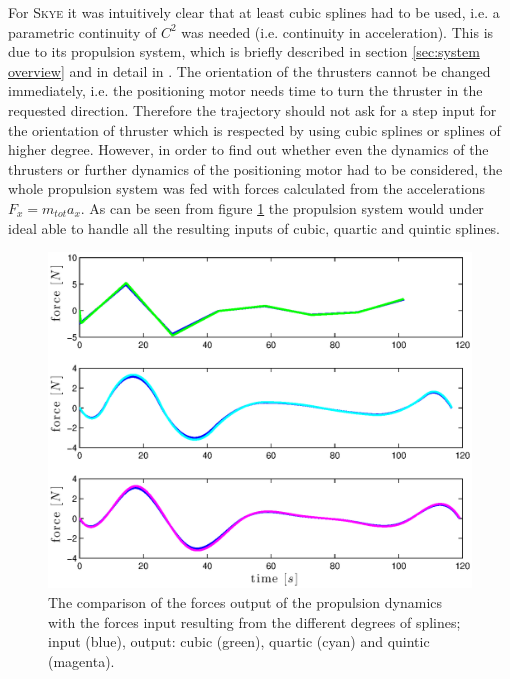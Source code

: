  For \textsc{Skye} it was intuitively clear that at least cubic splines had to be used, i.e. a parametric continuity of $C^2$ was needed (i.e. continuity in acceleration). This is due to its propulsion system, which is briefly described in section \ref{sec:system overview} and in detail in \cite{schaffnervu}. The orientation of the thrusters cannot be changed immediately, i.e. the positioning motor needs time to turn the thruster in the requested direction. Therefore the trajectory should not ask for a step input for the orientation of thruster which is respected by using cubic splines or splines of higher degree. However, in order to find out whether even the dynamics of the thrusters or further dynamics of the positioning motor had to be considered, the whole propulsion system was fed with forces calculated from the accelerations $F_x=m_{tot}a_x$. As can be seen from figure \ref{fig:forces} the propulsion system would under ideal  able to handle all the resulting inputs of cubic, quartic and quintic splines.
 
\begin{figure}[H]
	\centering
    \includegraphics[width = \textwidth]{graphics/forces.eps}
  \caption{The comparison of the forces output of the propulsion dynamics with the forces input resulting from the different degrees of splines; input (blue), output: cubic (green), quartic (cyan) and quintic (magenta).}
\label{fig:forces}
\end{figure} 


